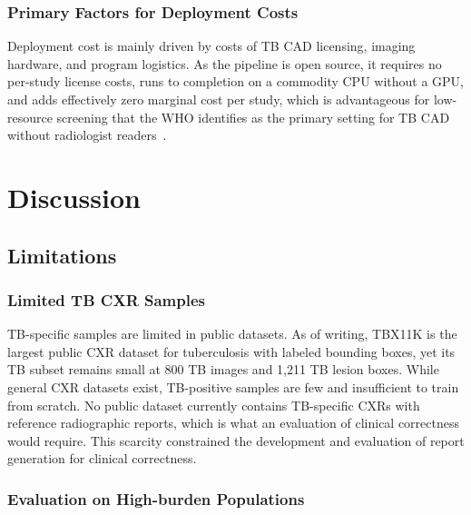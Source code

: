 \documentclass[conference, letterpaper]{IEEEtran}
\begin{document}
\subsubsection{Primary Factors for Deployment Costs}

Deployment cost is mainly driven by costs of TB CAD licensing, imaging hardware, and program logistics. As the pipeline is open source, it requires no per-study license costs, runs to completion on a commodity CPU without a GPU, and adds effectively zero marginal cost per study, which is advantageous for low-resource screening that the WHO identifies as the primary setting for TB CAD without radiologist readers~\cite{who_screening_2021}.

\section{Discussion}

\subsection{Limitations}

\subsubsection{Limited TB CXR Samples}

TB-specific samples are limited in public datasets. As of writing, TBX11K is the largest public CXR dataset for tuberculosis with labeled bounding boxes, yet its TB subset remains small at 800 TB images and 1,211 TB lesion boxes. While general CXR datasets exist, TB-positive samples are few and insufficient to train from scratch. No public dataset currently contains TB-specific CXRs with reference radiographic reports, which is what an evaluation of clinical correctness would require. This scarcity constrained the development and evaluation of report generation for clinical correctness.

\subsubsection{Evaluation on High-burden Populations}
\end{document}
